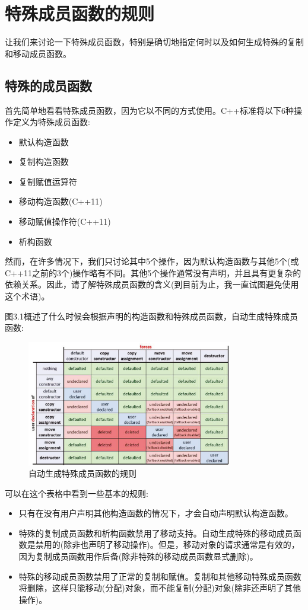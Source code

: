 \section{特殊成员函数的规则}
让我们来讨论一下特殊成员函数，特别是确切地指定何时以及如何生成特殊的复制和移动成员函数。

\subsection{特殊的成员函数}

首先简单地看看特殊成员函数，因为它以不同的方式使用。C++标准将以下6种操作定义为特殊成员函数:

\begin{itemize}
	\item 默认构造函数
	\item 复制构造函数
	\item 复制赋值运算符
	\item 移动构造函数(C++11)
	\item 移动赋值操作符(C++11)
	\item 析构函数
\end{itemize}

然而，在许多情况下，我们只讨论其中5个操作，因为默认构造函数与其他5个(或C++11之前的3个)操作略有不同。其他5个操作通常没有声明，并且具有更复杂的依赖关系。因此，请了解特殊成员函数的含义(到目前为止，我一直试图避免使用这个术语)。

图3.1概述了什么时候会根据声明的构造函数和特殊成员函数，自动生成特殊成员函数:

\begin{figure}
	\includegraphics[width=0.8\textwidth]{part1/ch3/images/1}
	\caption{自动生成特殊成员函数的规则}
\end{figure}


可以在这个表格中看到一些基本的规则:

\begin{itemize}
	\item 只有在没有用户声明其他构造函数的情况下，才会自动声明默认构造函数。
	\item 特殊的复制成员函数和析构函数禁用了移动支持。自动生成特殊的移动成员函数是禁用的(除非也声明了移动操作)。但是，移动对象的请求通常是有效的，因为复制成员函数用作后备(除非特殊的移动成员函数显式删除)。
	\item 特殊的移动成员函数禁用了正常的复制和赋值。复制和其他移动特殊成员函数将删除，这样只能移动(分配)对象，而不能复制(分配)对象(除非还声明了其他操作)。
\end{itemize}

